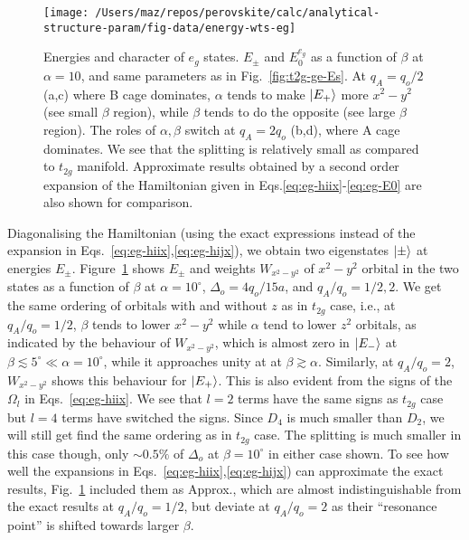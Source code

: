 \documentclass[a4paper,prb,twocolumn]{revtex4-1}  %
\begin{document}
\begin{figure}[htbp]
\begin{center}
\texttt{[image: /Users/maz/repos/perovskite/calc/analytical-structure-param/fig-data/energy-wts-eg]}
\caption{
Energies and character of $e_g$ states.
$E_{\pm}$ and $E_0^{e_g}$
as a function of $\beta$ at $\alpha=10$, 
and same parameters as in Fig.~\ref{fig:t2g-ge-Es}.
At $q_A=q_o/2$ (a,c) where B cage dominates,
$\alpha$ tends to make $\ket{E_{+}}$
more $x^2-y^2$ (see small $\beta$ region),
while $\beta$ tends to do the opposite 
(see large $\beta$ region).
The roles of $\alpha,\beta$ switch
at $q_A=2q_o$ (b,d), where A cage dominates.
We see that the splitting is relatively small as compared to $t_{2g}$ manifold.
Approximate results obtained by a second order expansion of the Hamiltonian given in Eqs.\ref{eq:eg-hiix}-\ref{eq:eg-E0}
are also shown for comparison.
}
\label{fig:e-wts-eg}
\end{center}
\end{figure}

Diagonalising the Hamiltonian 
(using the exact expressions instead 
of the expansion in Eqs.~\ref{eq:eg-hiix},\ref{eq:eg-hijx}),
we obtain two eigenstates $\ket{\pm}$
at energies $E_{\pm}$.
Figure~\ref{fig:e-wts-eg}
shows $E_{\pm}$ and weights $W_{x^2-y^2}$ of $x^2-y^2$ orbital
in the two states
as a function of $\beta$
at $\alpha=10^\circ$, $\Delta_o=4q_o/15a$,
and 
$q_A/q_o=1/2,2$.
We get the same ordering of orbitals with and without $z$ as in $t_{2g}$ case,
i.e.,
at $q_A/q_o=1/2$,
$\beta$ tends to lower
$x^2-y^2$ while $\alpha$ tend to lower $z^2$ orbitals,
as indicated by the behaviour of $W_{x^2-y^2}$,
which is almost zero in $\ket{E_{-}}$ at $\beta\lesssim 5^\circ \ll \alpha=10^\circ$,
while it approaches unity at 
at $\beta\gtrsim \alpha$.
Similarly, at $q_A/q_o=2$,
$W_{x^2-y^2}$ shows this behaviour for $\ket{E_{+}}$.
This is also evident from the signs of the $\Omega_l$
in Eqs.~\ref{eq:eg-hiix}.
We see that $l=2$ terms have the same signs as $t_{2g}$ case but 
$l=4$ terms have switched the signs. 
Since $D_4$ is much smaller than $D_2$,
we will still get find the same ordering as in $t_{2g}$ case.
The splitting is much smaller in this case though, only $\sim 0.5\%$ of $\Delta_o$
at $\beta=10^\circ$ in either case shown.
To see how well
the expansions in Eqs.~\ref{eq:eg-hiix},\ref{eq:eg-hijx})
can approximate the exact results,
Fig.~\ref{fig:e-wts-eg} included
them as Approx., which are almost indistinguishable from the exact results
at $q_A/q_o=1/2$, but deviate at $q_A/q_o=2$ as their
``resonance point'' is shifted towards larger $\beta$.
\end{document}
